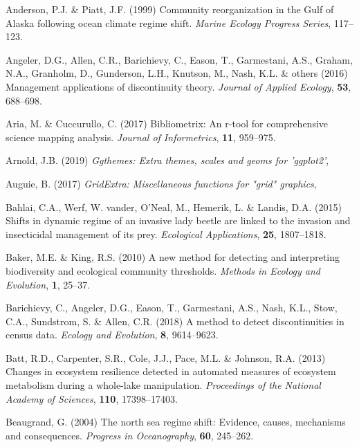 \documentclass[print]{nuthesis}
\begin{document}
\leavevmode\hypertarget{ref-anderson_community_1999}{}%
Anderson, P.J. \& Piatt, J.F. (1999) Community reorganization in the Gulf of Alaska following ocean climate regime shift. \emph{Marine Ecology Progress Series}, 117--123.

\leavevmode\hypertarget{ref-angeler2016management}{}%
Angeler, D.G., Allen, C.R., Barichievy, C., Eason, T., Garmestani, A.S., Graham, N.A., Granholm, D., Gunderson, L.H., Knutson, M., Nash, K.L. \& others (2016) Management applications of discontinuity theory. \emph{Journal of Applied Ecology}, \textbf{53}, 688--698.

\leavevmode\hypertarget{ref-bibliometrix}{}%
Aria, M. \& Cuccurullo, C. (2017) Bibliometrix: An r-tool for comprehensive science mapping analysis. \emph{Journal of Informetrics}, \textbf{11}, 959--975.

\leavevmode\hypertarget{ref-ggthemes}{}%
Arnold, J.B. (2019) \emph{Ggthemes: Extra themes, scales and geoms for 'ggplot2'},

\leavevmode\hypertarget{ref-gridExtra}{}%
Auguie, B. (2017) \emph{GridExtra: Miscellaneous functions for "grid" graphics},

\leavevmode\hypertarget{ref-bahlai2015shifts}{}%
Bahlai, C.A., Werf, W. vander, O'Neal, M., Hemerik, L. \& Landis, D.A. (2015) Shifts in dynamic regime of an invasive lady beetle are linked to the invasion and insecticidal management of its prey. \emph{Ecological Applications}, \textbf{25}, 1807--1818.

\leavevmode\hypertarget{ref-baker2010new}{}%
Baker, M.E. \& King, R.S. (2010) A new method for detecting and interpreting biodiversity and ecological community thresholds. \emph{Methods in Ecology and Evolution}, \textbf{1}, 25--37.

\leavevmode\hypertarget{ref-barichievy2018method}{}%
Barichievy, C., Angeler, D.G., Eason, T., Garmestani, A.S., Nash, K.L., Stow, C.A., Sundstrom, S. \& Allen, C.R. (2018) A method to detect discontinuities in census data. \emph{Ecology and Evolution}, \textbf{8}, 9614--9623.

\leavevmode\hypertarget{ref-batt2013changes}{}%
Batt, R.D., Carpenter, S.R., Cole, J.J., Pace, M.L. \& Johnson, R.A. (2013) Changes in ecosystem resilience detected in automated measures of ecosystem metabolism during a whole-lake manipulation. \emph{Proceedings of the National Academy of Sciences}, \textbf{110}, 17398--17403.

\leavevmode\hypertarget{ref-beaugrand2004north}{}%
Beaugrand, G. (2004) The north sea regime shift: Evidence, causes, mechanisms and consequences. \emph{Progress in Oceanography}, \textbf{60}, 245--262.
\end{document}
